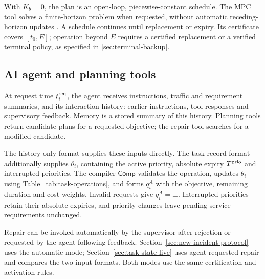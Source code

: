 \documentclass[preprint,12pt]{elsarticle}
\theoremstyle{definition}
\theoremstyle{plain}
\theoremstyle{definition}
\theoremstyle{plain}
\newcommand{\appref}[1]{\ref{#1}}
\begin{document}
With $K_b=0$, the plan is an open-loop, piecewise-constant schedule.
The MPC tool solves a finite-horizon problem when requested, without
automatic receding-horizon updates \cite{geroliminis2013mpc}. A schedule
continues until replacement or expiry. Its certificate covers $[t_0,E]$;
operation beyond $E$ requires a certified replacement or a verified
terminal policy, as specified in \appref{sec:terminal-backup}.

\subsection{AI agent and planning tools}
\label{sec:agent-requests}
At request time $t_i^{\rm req}$, the agent receives instructions, traffic
and requirement summaries, and its interaction history: earlier
instructions, tool responses and supervisory feedback. Memory is a stored
summary of this history. Planning tools return candidate plans for a
requested objective; the repair tool searches for a modified candidate.

The history-only format supplies these inputs directly. The task-record
format additionally supplies $\theta_i$, containing the active priority,
absolute expiry $T^{\rm prio}$ and interrupted priorities. The compiler
$\mathsf{Comp}$ validates the operation, updates $\theta_i$ using
Table~\ref{tab:task-operations}, and forms $q_i^A$ with the objective,
remaining duration and cost weights. Invalid requests give $q_i^A=\bot$.
Interrupted priorities retain their absolute expiries, and priority
changes leave pending service requirements unchanged.

Repair can be invoked automatically by the supervisor after rejection
or requested by the agent following feedback. Section~\ref{sec:new-incident-protocol}
uses the automatic mode; Section~\ref{sec:task-state-live} uses
agent-requested repair and compares the two input formats. Both modes
use the same certification and activation rules.
\end{document}
